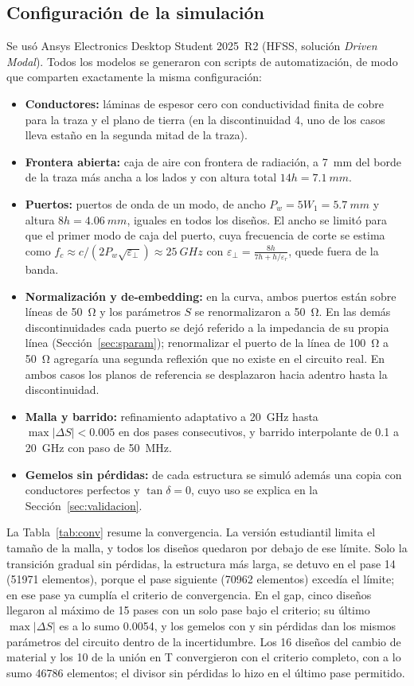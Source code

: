 \subsection{Configuración de la simulación}
\label{sec:config}
Se usó Ansys Electronics Desktop Student 2025~R2 (HFSS, solución \emph{Driven Modal}). Todos los modelos se generaron con scripts de automatización, de modo que comparten exactamente la misma configuración:
\begin{itemize}
\item \textbf{Conductores:} láminas de espesor cero con conductividad finita de cobre para la traza y el plano de tierra (en la discontinuidad 4, uno de los casos lleva estaño en la segunda mitad de la traza).
\item \textbf{Frontera abierta:} caja de aire con frontera de radiación, a \SI{7}{mm} del borde de la traza más ancha a los lados y con altura total $14h=\SI{7.1}{mm}$.
\item \textbf{Puertos:} puertos de onda de un modo, de ancho $P_w=5W_1=\SI{5.7}{mm}$ y altura $8h=\SI{4.06}{mm}$, iguales en todos los diseños. El ancho se limitó para que el primer modo de caja del puerto, cuya frecuencia de corte se estima como $f_c\approx c/\left(2P_w\sqrt{\varepsilon_\perp}\right)\approx\SI{25}{GHz}$ con $\varepsilon_\perp=\frac{8h}{7h+h/\varepsilon_r}$, quede fuera de la banda.
\item \textbf{Normalización y de-embedding:} en la curva, ambos puertos están sobre líneas de \SI{50}{\ohm} y los parámetros $S$ se renormalizaron a \SI{50}{\ohm}. En las demás discontinuidades cada puerto se dejó referido a la impedancia de su propia línea (Sección~\ref{sec:sparam}); renormalizar el puerto de la línea de \SI{100}{\ohm} a \SI{50}{\ohm} agregaría una segunda reflexión que no existe en el circuito real. En ambos casos los planos de referencia se desplazaron hacia adentro hasta la discontinuidad.
\item \textbf{Malla y barrido:} refinamiento adaptativo a \SI{20}{GHz} hasta $\max|\Delta S|<0.005$ en dos pases consecutivos, y barrido interpolante de \SI{0.1}{} a \SI{20}{GHz} con paso de \SI{50}{MHz}.
\item \textbf{Gemelos sin pérdidas:} de cada estructura se simuló además una copia con conductores perfectos y $\tan\delta=0$, cuyo uso se explica en la Sección~\ref{sec:validacion}.
\end{itemize}
La Tabla~\ref{tab:conv} resume la convergencia. La versión estudiantil limita el tamaño de la malla, y todos los diseños quedaron por debajo de ese límite. Solo la transición gradual sin pérdidas, la estructura más larga, se detuvo en el pase 14 (\num{51971} elementos), porque el pase siguiente (\num{70962} elementos) excedía el límite; en ese pase ya cumplía el criterio de convergencia. En el gap, cinco diseños llegaron al máximo de 15 pases con un solo pase bajo el criterio; su último $\max|\Delta S|$ es a lo sumo 0.0054, y los gemelos con y sin pérdidas dan los mismos parámetros del circuito dentro de la incertidumbre. Los 16 diseños del cambio de material y los 10 de la unión en T convergieron con el criterio completo, con a lo sumo \num{46786} elementos; el divisor sin pérdidas lo hizo en el último pase permitido.

